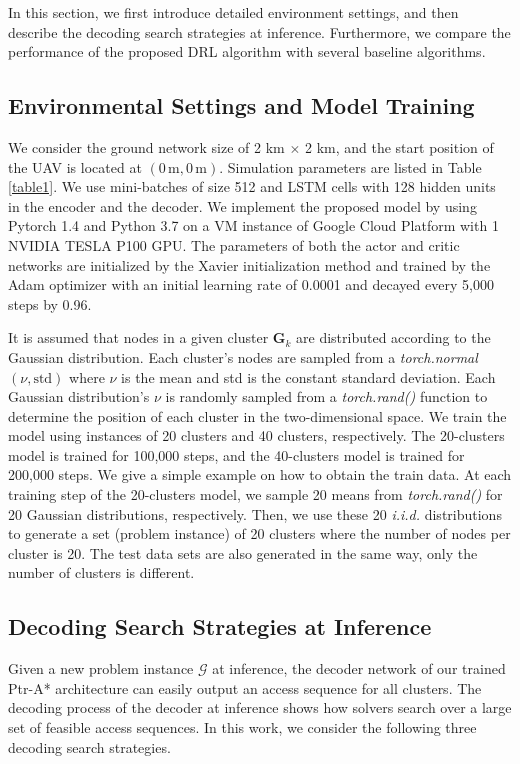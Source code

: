 \documentclass[journal]{IEEEtran}
\begin{document}
In this section, we first introduce detailed environment settings, and then describe the decoding search strategies at inference. Furthermore, we compare the performance of the proposed DRL algorithm with several baseline algorithms.

\subsection{Environmental Settings and Model Training}

We consider the ground network size of 2 km $\times$ 2 km, and the start position of the UAV is located at $(0\,\text{m}, 0\,\text{m})$. Simulation parameters are listed in Table \ref{table1}. We use mini-batches of size 512 and LSTM cells with 128 hidden units in the encoder and the decoder. We implement the proposed model by using Pytorch 1.4 and Python 3.7 on a VM instance of Google Cloud Platform with 1 NVIDIA TESLA P100 GPU. The parameters of both the actor and critic networks are initialized by the Xavier initialization method and trained by the Adam optimizer with an initial learning rate of 0.0001 and decayed every 5,000 steps by 0.96.

{It is assumed that nodes in a given cluster $\bm{G}_k$ are distributed according to the Gaussian distribution. Each cluster's nodes are} sampled from a \emph{torch.normal}$(\nu, \text{std})$ where $\nu$ is the mean and std is the constant standard deviation. Each Gaussian distribution's $\nu$ is randomly sampled from a \emph{torch.rand()} function to determine the position of each cluster in the two-dimensional space. We train the model using instances of 20 clusters and 40 clusters, respectively. The 20-clusters model is trained for 100,000 steps, and the 40-clusters model is trained for 200,000 steps. We give a simple example on how to obtain the train data. At each training step of the 20-clusters model, we sample 20 means from \emph{torch.rand()} for 20 Gaussian distributions, respectively. Then, we use these 20 \emph{i.i.d.} distributions to generate a set (problem instance) of 20 clusters where the number of nodes per cluster is 20. The test data sets are also generated in the same way, only the number of clusters is different.



\subsection{Decoding Search Strategies at Inference}
Given a new problem instance $\bm{\mathcal{G}}$ at inference, the decoder network of our trained Ptr-A* architecture can easily output an access sequence for all clusters. The decoding process of the decoder at inference shows how solvers search over a large set of feasible access sequences. In this work, we consider the following three decoding search strategies.
\end{document}

